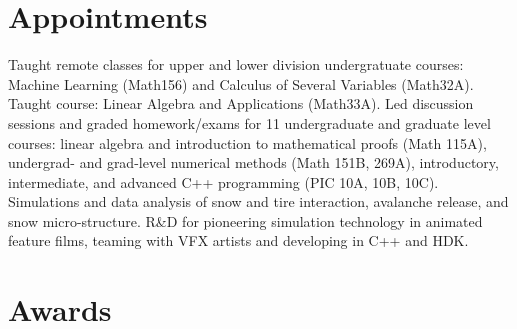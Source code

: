 \documentclass[11pt,a4paper,unicode]{moderncv}
\begin{document}
\section{Appointments}
{Taught remote classes for upper and lower division undergratuate courses: Machine Learning (Math156) and Calculus of Several Variables (Math32A).}
{Taught course: Linear Algebra and Applications (Math33A).}
{Led discussion sessions and graded homework/exams for 11 undergraduate and graduate level courses: linear algebra and introduction to mathematical proofs (Math 115A), undergrad- and grad-level numerical methods (Math 151B, 269A), introductory, intermediate, and advanced C++ programming (PIC 10A, 10B, 10C).}
{Simulations and data analysis of snow and tire interaction, avalanche release, and snow micro-structure.}
{R\&D for pioneering simulation technology in animated feature films, teaming with VFX artists and developing in C++ and HDK. }

\vspace*{-2mm}
\section{Awards}

\end{document}
